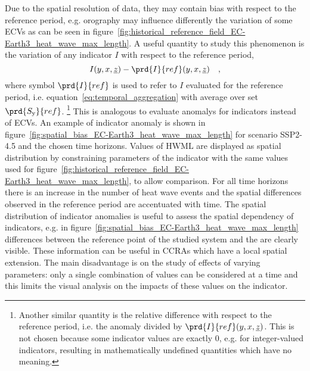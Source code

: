 Due to the spatial resolution of data, they may contain bias with respect to the reference period, e.g. orography may influence differently the variation of some \glspl{ECV} as can be seen in figure~\ref{fig:historical_reference_field_EC-Earth3_heat_wave_max_length}.
A useful quantity to study this phenomenon is the variation of any \gls{indicator} $I$ with respect to the reference period,
\begin{equation}
  \label{eq:spatial_bias}
  I(y, x, \underline{z}) - \prd{I}{ref}(y, x, \underline{z})
  \quad ,
\end{equation}
where symbol $\prd{I}{ref}$ is used to refer to $I$ evaluated for the reference period, i.e. equation~\eqref{eq:temporal_aggregation} with average over set $\prd{S_\text{y}}{ref}$.%
\footnote{Another similar quantity is the relative difference with respect to the reference period, i.e. the anomaly divided by $\prd{I}{ref}(y, x, \underline{z})$. This is not chosen because some indicator values are exactly 0, e.g. for integer-valued indicators, resulting in mathematically undefined quantities which have no meaning.}
This is analogous to evaluate \glspl{anomaly} for indicators instead of \glspl{ECV}.
An example of indicator anomaly is shown in figure~\ref{fig:spatial_bias_EC-Earth3_heat_wave_max_length} for scenario SSP2-4.5 and the chosen time horizons. Values of $\mathrm{HWML}$ are displayed as spatial distribution by constraining parameters of the indicator with the same values used for figure~\ref{fig:historical_reference_field_EC-Earth3_heat_wave_max_length}, to allow comparison. For all time horizons there is an increase in the number of heat wave events and the spatial differences observed in the reference period are accentuated with time. The spatial distribution of indicator anomalies is useful to assess the spatial dependency of indicators, e.g. in figure~\ref{fig:spatial_bias_EC-Earth3_heat_wave_max_length} differences between the reference point of the studied system and the are clearly visible. These information can be useful in \glspl{CCRA} which have a local spatial extension. The main disadvantage is on the study of effects of varying parameters: only a single combination of values can be considered at a time and this limits the visual analysis on the impacts of these values on the indicator.
